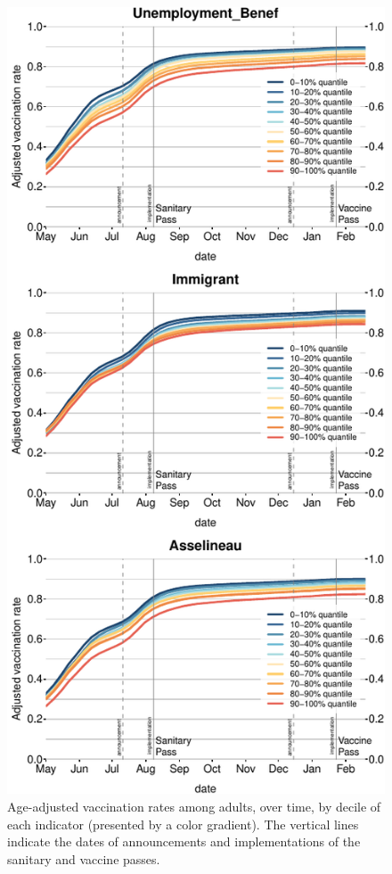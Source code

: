 \documentclass[
]{article}
\begin{document}
\begin{figure}
\centering
\includegraphics{ms_files/figure-latex/figOverTime-1.pdf}
\caption{Age-adjusted vaccination rates among adults, over time, by
decile of each indicator (presented by a color gradient). The vertical
lines indicate the dates of announcements and implementations of the
sanitary and vaccine passes.}
\end{figure}
\end{document}
